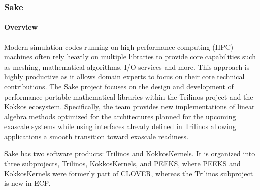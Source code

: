 \subsubsection{ Sake} \label{subsubsect:sake}

\paragraph{Overview} 

Modern simulation codes running on high performance computing (HPC) machines often rely heavily on multiple libraries to provide core capabilities such as 
meshing, mathematical algorithms, I/O services and more. This approach is highly productive as it allows domain experts to focus on their core technical 
contributions. The Sake project focuses on the design and development of performance portable mathematical libraries within the Trilinos project and the 
Kokkos ecosystem. Specifically, the team provides new implementations of linear algebra methods optimized for the architectures planned for the upcoming exascale 
systems while using interfaces already defined in Trilinos allowing applications a smooth transition toward exascale readiness.

Sake has two software products: Trilinos and KokkosKernels. It is organized into three subprojects, Trilinos, KokkosKernels, and PEEKS, where 
PEEKS and KokkosKernels were formerly part of CLOVER, whereas the Trilinos subproject is new in ECP.
